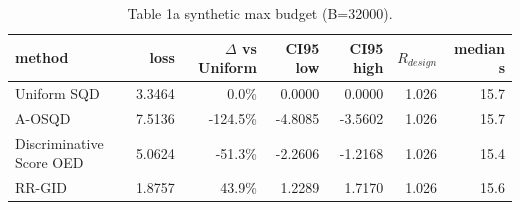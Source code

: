 \begin{table}[t]
\centering
\small
\caption{Table 1a synthetic max budget (B=32000).}
\label{tab:Table_1a_synthetic_max_budget_B32000}
\begin{tabular}{lrrrrrr}
\toprule
method & loss & $\Delta$ vs Uniform & CI95 low & CI95 high & $R_{design}$ & median s \\
\midrule
Uniform SQD & 3.3464 & 0.0\% & 0.0000 & 0.0000 & 1.026 & 15.7 \\
A-OSQD & 7.5136 & -124.5\% & -4.8085 & -3.5602 & 1.026 & 15.7 \\
Discriminative Score OED & 5.0624 & -51.3\% & -2.2606 & -1.2168 & 1.026 & 15.4 \\
RR-GID & 1.8757 & 43.9\% & 1.2289 & 1.7170 & 1.026 & 15.6 \\
\bottomrule
\end{tabular}
\end{table}
